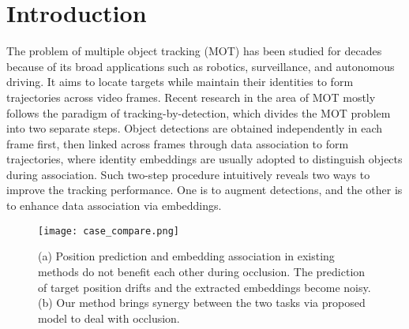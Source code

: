 \documentclass[final]{cvpr}
\begin{document}
\section{Introduction}
The problem of multiple object tracking (MOT) has been studied for decades because of its broad applications such as robotics, surveillance, and autonomous driving. It aims to locate targets while maintain their identities to form trajectories across video frames.
Recent research in the area of MOT mostly follows the paradigm of tracking-by-detection, which divides the MOT problem into two separate steps. Object detections are obtained independently in each frame first, then linked across frames through data association to form trajectories, where identity embeddings are usually adopted to distinguish objects during association.
Such two-step procedure intuitively reveals two ways to improve the tracking performance. One is to augment detections, and the other is to enhance data association via embeddings.

\begin{figure}[t]
\begin{center}
    \texttt{[image: case\_compare.png]}
\end{center}
   \caption{(a) Position prediction and embedding association in existing methods do not benefit each other during occlusion. The prediction of target position drifts and the extracted embeddings become noisy. (b) Our method brings synergy between the two tasks via proposed model to deal with occlusion.}
\label{fig:cover}
\end{figure}
\end{document}
